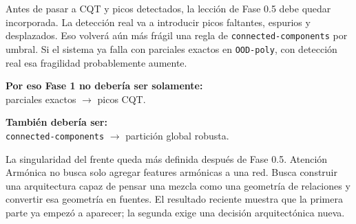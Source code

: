 \documentclass[11pt]{article}
\begin{document}
Antes de pasar a CQT y picos detectados, la lección de Fase 0.5 debe quedar incorporada. La detección real va a introducir picos faltantes, espurios y desplazados. Eso volverá aún más frágil una regla de \texttt{connected-components} por umbral. Si el sistema ya falla con parciales exactos en \texttt{OOD-poly}, con detección real esa fragilidad probablemente aumente.

\begin{quietbox}
\textbf{Por eso Fase 1 no debería ser solamente:}\\
parciales exactos $\to$ picos CQT.\par\smallskip
\textbf{También debería ser:}\\
\texttt{connected-components} $\to$ partición global robusta.
\end{quietbox}

La singularidad del frente queda más definida después de Fase 0.5. Atención Armónica no busca solo agregar features armónicas a una red. Busca construir una arquitectura capaz de pensar una mezcla como una geometría de relaciones y convertir esa geometría en fuentes. El resultado reciente muestra que la primera parte ya empezó a aparecer; la segunda exige una decisión arquitectónica nueva.
\end{document}
